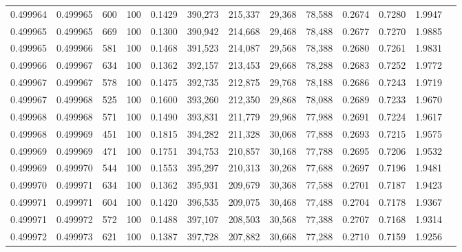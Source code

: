 \begin{tabular}{rrrrrrrrrrrrr}
0.499964 & 0.499965 &   600 & 100 &                                     0.1429 & 390,273 & 215,337 &  29,368 &  78,588 & 0.2674 & 0.7280 & 1.9947 \\
0.499965 & 0.499965 &   669 & 100 &                                     0.1300 & 390,942 & 214,668 &  29,468 &  78,488 & 0.2677 & 0.7270 & 1.9885 \\
0.499965 & 0.499966 &   581 & 100 &                                     0.1468 & 391,523 & 214,087 &  29,568 &  78,388 & 0.2680 & 0.7261 & 1.9831 \\
0.499966 & 0.499967 &   634 & 100 &                                     0.1362 & 392,157 & 213,453 &  29,668 &  78,288 & 0.2683 & 0.7252 & 1.9772 \\
0.499967 & 0.499967 &   578 & 100 &                                     0.1475 & 392,735 & 212,875 &  29,768 &  78,188 & 0.2686 & 0.7243 & 1.9719 \\
0.499967 & 0.499968 &   525 & 100 &                                     0.1600 & 393,260 & 212,350 &  29,868 &  78,088 & 0.2689 & 0.7233 & 1.9670 \\
0.499968 & 0.499968 &   571 & 100 &                                     0.1490 & 393,831 & 211,779 &  29,968 &  77,988 & 0.2691 & 0.7224 & 1.9617 \\
0.499968 & 0.499969 &   451 & 100 &                                     0.1815 & 394,282 & 211,328 &  30,068 &  77,888 & 0.2693 & 0.7215 & 1.9575 \\
0.499969 & 0.499969 &   471 & 100 &                                     0.1751 & 394,753 & 210,857 &  30,168 &  77,788 & 0.2695 & 0.7206 & 1.9532 \\
0.499969 & 0.499970 &   544 & 100 &                                     0.1553 & 395,297 & 210,313 &  30,268 &  77,688 & 0.2697 & 0.7196 & 1.9481 \\
0.499970 & 0.499971 &   634 & 100 &                                     0.1362 & 395,931 & 209,679 &  30,368 &  77,588 & 0.2701 & 0.7187 & 1.9423 \\
0.499971 & 0.499971 &   604 & 100 &                                     0.1420 & 396,535 & 209,075 &  30,468 &  77,488 & 0.2704 & 0.7178 & 1.9367 \\
0.499971 & 0.499972 &   572 & 100 &                                     0.1488 & 397,107 & 208,503 &  30,568 &  77,388 & 0.2707 & 0.7168 & 1.9314 \\
0.499972 & 0.499973 &   621 & 100 &                                     0.1387 & 397,728 & 207,882 &  30,668 &  77,288 & 0.2710 & 0.7159 & 1.9256 \\

\end{tabular}
